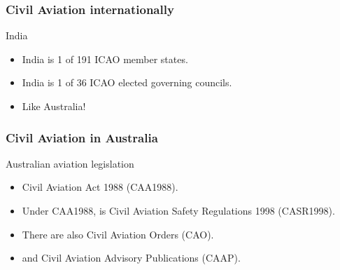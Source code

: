 \begin{frame}
\frametitle{Civil Aviation internationally}
\begin{block}{India}
\begin{itemize}
\item<1-> India is 1 of 191 ICAO member states.
\item<1-> India is 1 of 36 ICAO elected governing councils.
\item<2-> Like Australia!
\end{itemize}
\end{block}
\end{frame}

\begin{frame}
\frametitle{Civil Aviation in Australia}
\begin{block}{Australian aviation legislation}
\begin{itemize}
\item<1-> Civil Aviation Act 1988 (CAA1988).
\item<2-> Under CAA1988, is Civil Aviation Safety Regulations 1998 (CASR1998).
\item<3-> There are also Civil Aviation Orders (CAO).
\item<4-> and Civil Aviation Advisory Publications (CAAP).
\end{itemize}
\end{block}
\end{frame}
